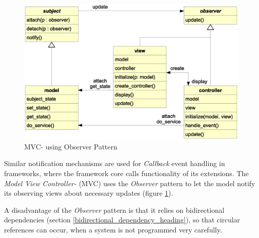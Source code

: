 \begin{figure}[ht]
    \begin{center}
        \includegraphics[scale=0.3]{vector/mvcobserver.eps}
        \caption{MVC- using Observer Pattern}
        \label{mvcobserver_figure}
    \end{center}
\end{figure}

Similar notification mechanisms are used for \emph{Callback} event handling in
frameworks, where the framework core calls functionality of its extensions. The
\emph{Model View Controller-} (MVC) uses the \emph{Observer} pattern to let the
model notify its observing views about necessary updates (figure
\ref{mvcobserver_figure}).

A disadvantage of the \emph{Observer} pattern is that it relies on bidirectional
dependencies (section \ref{bidirectional_dependency_heading}), so that circular
references can occur, when a system is not programmed very carefully.
